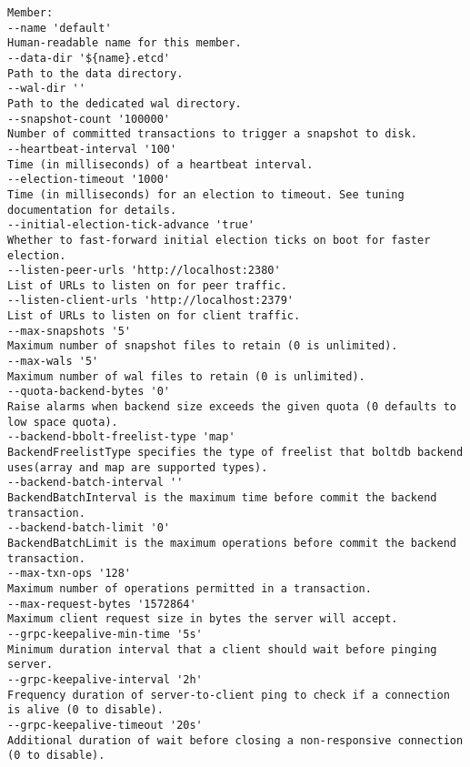 \begin{verbatim}
Member:
--name 'default'
Human-readable name for this member.
--data-dir '${name}.etcd'
Path to the data directory.
--wal-dir ''
Path to the dedicated wal directory.
--snapshot-count '100000'
Number of committed transactions to trigger a snapshot to disk.
--heartbeat-interval '100'
Time (in milliseconds) of a heartbeat interval.
--election-timeout '1000'
Time (in milliseconds) for an election to timeout. See tuning documentation for details.
--initial-election-tick-advance 'true'
Whether to fast-forward initial election ticks on boot for faster election.
--listen-peer-urls 'http://localhost:2380'
List of URLs to listen on for peer traffic.
--listen-client-urls 'http://localhost:2379'
List of URLs to listen on for client traffic.
--max-snapshots '5'
Maximum number of snapshot files to retain (0 is unlimited).
--max-wals '5'
Maximum number of wal files to retain (0 is unlimited).
--quota-backend-bytes '0'
Raise alarms when backend size exceeds the given quota (0 defaults to low space quota).
--backend-bbolt-freelist-type 'map'
BackendFreelistType specifies the type of freelist that boltdb backend uses(array and map are supported types).
--backend-batch-interval ''
BackendBatchInterval is the maximum time before commit the backend transaction.
--backend-batch-limit '0'
BackendBatchLimit is the maximum operations before commit the backend transaction.
--max-txn-ops '128'
Maximum number of operations permitted in a transaction.
--max-request-bytes '1572864'
Maximum client request size in bytes the server will accept.
--grpc-keepalive-min-time '5s'
Minimum duration interval that a client should wait before pinging server.
--grpc-keepalive-interval '2h'
Frequency duration of server-to-client ping to check if a connection is alive (0 to disable).
--grpc-keepalive-timeout '20s'
Additional duration of wait before closing a non-responsive connection (0 to disable).


\end{verbatim}

